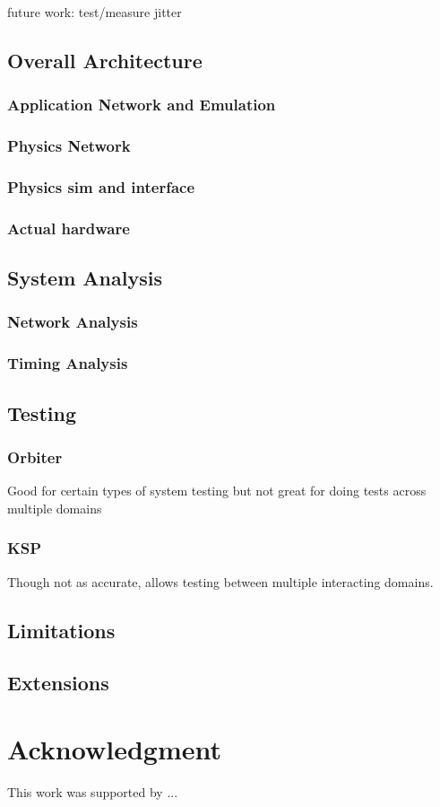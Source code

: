 \documentclass[conference]{IEEEtran}
\begin{document}
future work:
test/measure jitter




\subsection{Overall Architecture}
\subsubsection{Application Network and Emulation}
\subsubsection{Physics Network}
\subsubsection{Physics sim and interface}
\subsubsection{Actual hardware}

\subsection{System Analysis}
\subsubsection{Network Analysis}
\subsubsection{Timing Analysis}

\subsection{Testing}
\subsubsection{Orbiter}
Good for certain types of system testing but not great for doing tests across multiple domains
\subsubsection{KSP}
Though not as accurate, allows testing between multiple interacting domains.

\subsection{Limitations}

\subsection{Extensions}





\section*{Acknowledgment}

This work was supported by ... 


%
\end{document}
